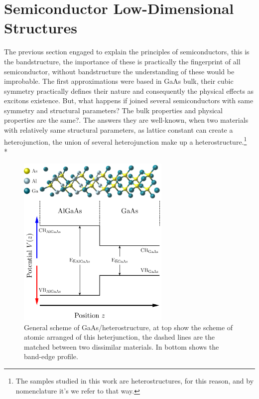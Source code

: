 \section{Semiconductor Low-Dimensional Structures}
\label{sec:chapter-1-low-dimensional-structures}
\vspace{-10mm} 
The previous section engaged to explain the principles of semiconductors, this is the bandstructure, the importance of these is practically the fingerprint of all semiconductor, without bandstructure  the understanding of these would be improbable. The first approximations were based in  GaAs bulk, their cubic symmetry practically defines their nature and consequently the physical effects as excitons existence.  But, what happens  if joined several semiconductors with same symmetry and structural parameters? The bulk properties and physical properties are the same?. 
The answers they are well-known, when two materials with relatively same structural parameters, as lattice constant can create a heterojunction, the union of several heterojunction make up a heterostructure.\footnote{The samples studied in this work are heterostructures, for this reason, and by nomenclature it's we refer to that way.}\\*
\begin{figure}[h]
	\centering
	\includegraphics[width=0.65\textwidth]{../figures/chapter-1/heterostructures/out/hs-01}
	\caption{General scheme of GaAs/\algaas heterostructure, at top show the scheme of atomic arranged of this heterjunction, the dashed lines are the matched between two dissimilar materials. In bottom shows the band-edge profile.}
	\label{fig:subsection-1.2-heterostructure}
\end{figure}
